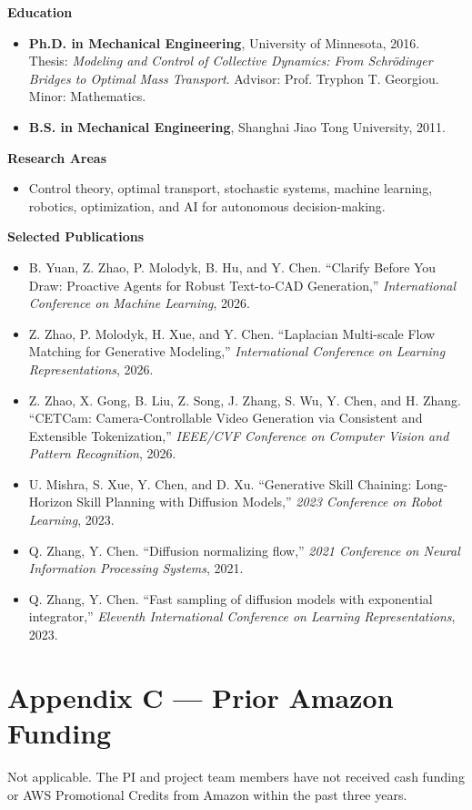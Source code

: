 \documentclass[11pt]{article}
\begin{document}
\vspace{-4pt}

\noindent\textbf{Education}
\begin{itemize}
    \item \textbf{Ph.D. in Mechanical Engineering}, University of Minnesota, 2016.\\
    Thesis: \emph{Modeling and Control of Collective Dynamics: From Schr\"odinger Bridges to Optimal Mass Transport}. Advisor: Prof. Tryphon T. Georgiou. Minor: Mathematics.
    \item \textbf{B.S. in Mechanical Engineering}, Shanghai Jiao Tong University, 2011.
\end{itemize}

\vspace{-4pt}

\noindent\textbf{Research Areas}
\vspace{-4pt}
\begin{itemize}
    \item Control theory, optimal transport, stochastic systems, machine learning, robotics, optimization, and AI for autonomous decision-making.
\end{itemize}

\vspace{-4pt}

\noindent\textbf{Selected Publications}
\vspace{-4pt}
\begin{itemize}
\item
B. Yuan, Z. Zhao, P. Molodyk, B. Hu, and Y. Chen.
``Clarify Before You Draw: Proactive Agents for Robust Text-to-CAD Generation,'' 
{\em International Conference on Machine Learning}, 2026.
    \item Z. Zhao, P. Molodyk, H. Xue, and Y. Chen.
    ``Laplacian Multi-scale Flow Matching for Generative Modeling,'' 
    {\em International Conference on Learning Representations}, 2026.
    \item
    Z. Zhao, X. Gong, B. Liu, Z. Song, J. Zhang, S. Wu, Y. Chen, and H. Zhang.
    ``CETCam: Camera-Controllable Video Generation via Consistent and Extensible Tokenization,'' 
    {\em IEEE/CVF Conference on Computer Vision and Pattern Recognition}, 2026.
    \item
	U. Mishra, S. Xue, Y. Chen, and D. Xu.
	``Generative Skill Chaining: Long-Horizon Skill Planning with Diffusion Models,'' {\em 2023 Conference on Robot Learning\/}, 2023.
      \item
    Q. Zhang, Y. Chen. ``Diffusion normalizing flow,'' {\em 2021 Conference on Neural Information Processing Systems\/}, 2021.
 \item
   Q. Zhang, Y. Chen.
   ``Fast sampling of diffusion models with exponential integrator,'' {\em Eleventh International Conference on Learning Representations\/}, 2023.
\end{itemize}

\newpage
\section*{Appendix C --- Prior Amazon Funding}

Not applicable. The PI and project team members have not received cash funding or AWS Promotional Credits from Amazon within the past three years.
\end{document}
